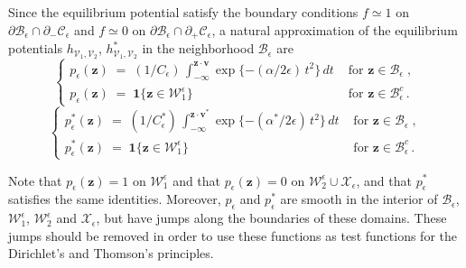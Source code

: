 \documentclass[reqno]{amsart}
\newcounter{as}[section]
\newcommand{\mc}[1]{{\mathcal #1}}
\newcommand{\bs}[1]{{\boldsymbol #1}}
\newcommand{\<}{\langle}
\renewcommand{\>}{\rangle}
\begin{document}
Since the equilibrium potential satisfy the boundary conditions
$f\simeq1$ on $\partial \mc{B}_{\epsilon} \cap \partial_{-}
\mc{C}_{\epsilon}$ and $f\simeq 0$ on $\partial \mc{B}_{\epsilon}
\cap \partial_{+} \mc{C}_{\epsilon}$, a natural approximation of the
equilibrium potentials $h_{\mc{V}_{1},\mc{V}_{2}}$,
$h_{\mc{V}_{1},\mc{V}_{2}}^{*}$ in the neighborhood
$\mc{B}_{\epsilon}$ are
\begin{equation}
\label{ins03}
\begin{cases}
p_{\epsilon}(\bs{z})\;=\; (1/C_{\epsilon})\,
\int_{-\infty}^{\bs{z}\cdot\bs{v}}
\exp \{ - (\alpha/2\epsilon)\, t^{2} \} \, dt
& \text{ for } \bs{z}\in\mc{B}_{\epsilon}\;, \\
p_{\epsilon}(\bs{z})\;=\; \bs 1 \{\bs{z}\in\mc{W}_{1}^{\epsilon}\}
& \mbox{ for }\bs{z} \in \mc{B}_{\epsilon}^c\,.
\end{cases}
\end{equation}
\begin{equation*}
\begin{cases}
p^*_{\epsilon}(\bs{z})\;=\; (1/C^*_{\epsilon})\,
\int_{-\infty}^{\bs{z}\cdot\bs{v}^*}
\exp \{ - (\alpha^*/2\epsilon)\, t^{2} \} \, dt
& \text{ for } \bs{z}\in\mc{B}_{\epsilon}\;, \\
p^*_{\epsilon}(\bs{z})\;=\; \bs 1 \{\bs{z}\in\mc{W}_{1}^{\epsilon}\}
& \mbox{ for }\bs{z} \in \mc{B}_{\epsilon}^c\,.
\end{cases}
\end{equation*}

Note that $p_{\epsilon}(\bs{z}) = 1$ on $\mc{W}_{1}^{\epsilon}$ and
that $p_{\epsilon}(\bs{z}) = 0$ on $\mc{W}_{2}^{\epsilon} \cup
\mc{X}_{\epsilon}$, and that $p_{\epsilon}^{*}$ satisfies the same
identities. Moreover, $p_{\epsilon}$ and $p_{\epsilon}^{*}$ are smooth
in the interior of $\mc{B}_{\epsilon}$, $\mc{W}_{1}^{\epsilon}$,
$\mc{W}_{2}^{\epsilon}$ and $\mc{X}_{\epsilon}$, but have jumps along
the boundaries of these domains. These jumps should be removed in
order to use these functions as test functions for the Dirichlet's and Thomson's principles.
\end{document}
